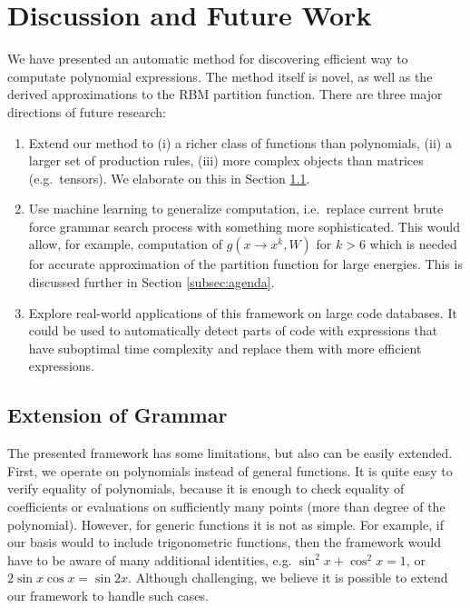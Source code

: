 \section{Discussion and Future Work}

We have presented an automatic method for discovering efficient way to
computate polynomial expressions. The method itself is novel, as well as the derived
approximations to the RBM partition function. There are three
major directions of future research: 

\begin{enumerate}
  \item Extend our method to (i) a richer class of functions
    than polynomials, (ii) a larger set of production rules, (iii) more complex
    objects than matrices (e.g.~tensors). We elaborate on this in
    Section \ref{sec:extend}.

  \item Use machine learning to generalize computation, i.e.~replace 
    current brute force grammar search process with something more
    sophisticated. This would allow, for example, computation of
$g(x \rightarrow x^k, W)$ for $k > 6$ which is needed for accurate
approximation of the partition function for large energies. This is discussed further in
Section \ref{subsec:agenda}.



\item Explore real-world applications of this framework on large code databases. 
  It could be used to automatically detect parts of code with expressions that have suboptimal 
  time complexity and replace them with more efficient expressions.
\end{enumerate}



\subsection{Extension of Grammar}
\label{sec:extend}
The presented framework has some limitations, but also can be easily extended. First,
we operate on polynomials instead of general functions. It is quite easy to verify
equality of polynomials, because it is enough to check equality of coefficients or
evaluations on sufficiently many points (more than degree of
the polynomial). However, for generic functions
it is not as simple. For example, if our basis would to include trigonometric functions, then the
framework would have to be aware of many additional identities,
e.g. $\sin^2{x} + \cos^2{x} = 1$, or $2\sin x \cos x = \sin
2x$. Although challenging, we believe it is possible to extend our
framework to handle such cases. 

